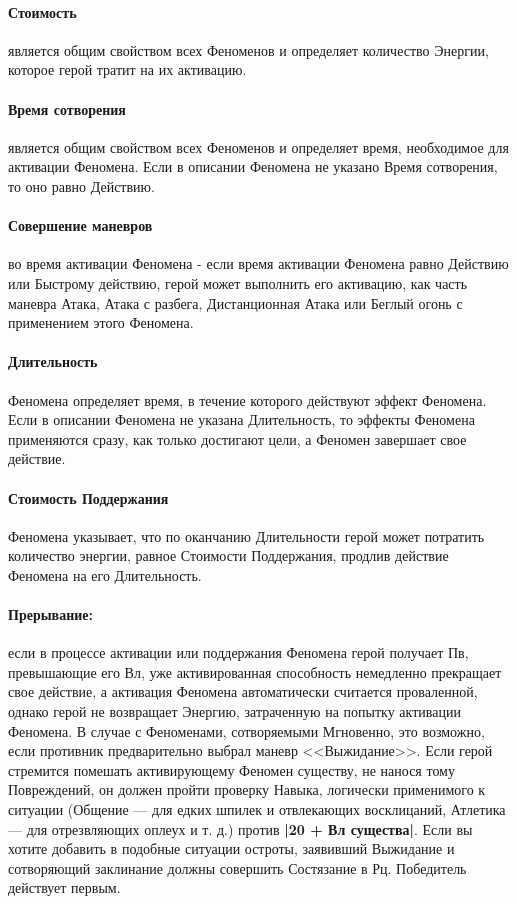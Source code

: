 \paragraph{Стоимость} является общим свойством всех Феноменов и определяет количество Энергии, которое герой тратит на их активацию.
\paragraph{Время сотворения} является общим свойством всех Феноменов и определяет время, необходимое для активации Феномена. Если в описании Феномена не указано Время сотворения, то оно равно Действию.
\paragraph{Совершение маневров} во время активации Феномена - если время активации Феномена равно Действию или Быстрому действию, герой может выполнить его активацию, как часть маневра Атака, Атака с разбега, Дистанционная Атака или Беглый огонь с применением этого Феномена.
\paragraph{Длительность} Феномена определяет время, в течение которого действуют эффект Феномена. Если в описании Феномена не указана Длительность, то эффекты Феномена применяются сразу, как только достигают цели, а Феномен завершает свое действие.
\paragraph{Стоимость Поддержания} Феномена указывает, что по оканчанию Длительности герой может потратить количество энергии, равное Стоимости Поддержания, продлив действие Феномена на его Длительность.
\paragraph{Прерывание:} если в процессе активации или поддержания Феномена герой получает Пв, превышающие его Вл, уже активированная способность немедленно прекращает свое действие, а активация Феномена автоматически считается проваленной, однако герой не возвращает Энергию, затраченную на попытку активации Феномена. В случае с Феноменами, сотворяемыми Мгновенно, это возможно, если противник предварительно выбрал маневр <<Выжидание>>.
\newline
Если герой стремится помешать активирующему Феномен существу, не нанося тому Повреждений, он должен пройти проверку Навыка, логически применимого к ситуации (Общение — для едких шпилек и отвлекающих восклицаний, Атлетика — для отрезвляющих оплеух и т. д.) против \textbf{|20 + Вл существа|}.
\newline
Если вы хотите добавить в подобные ситуации остроты, заявивший Выжидание и сотворяющий заклинание должны совершить Состязание в Рц. Победитель действует первым.
